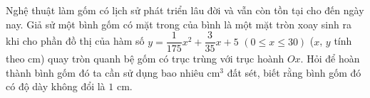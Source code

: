 \begin{bt}%
	Nghệ thuật làm gốm có lịch sử  phát triển lâu đời và vẫn còn tồn tại cho đến ngày nay. Giả sử một bình gốm có mặt trong của bình là một mặt tròn xoay sinh ra khi cho phần đồ thị của hàm số $y=\dfrac{1}{175} x^2+\dfrac{3}{35} x+5$ $\left(0 \leq x \leq 30\right)$ ($x$, $y$ tính theo cm) quay tròn quanh bệ gốm có trục trùng với trục hoành $O x$. Hỏi để hoàn thành bình gốm đó ta cần sử dụng bao nhiêu cm$^3$ đất sét, biết rằng bình gốm đó có độ dày không đổi là $1$ cm.
\end{bt}

